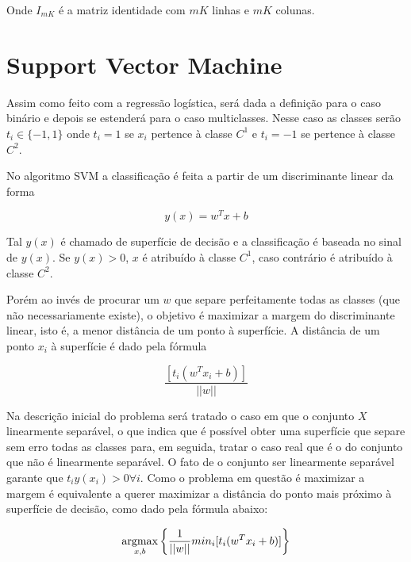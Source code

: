 Onde $I_{mK}$ é a matriz identidade com $mK$ linhas e $mK$ colunas.

\section{Support Vector Machine}

Assim como feito com a regressão logística, será dada a definição
para o caso binário e depois se estenderá para o caso multiclasses. Nesse caso
as  classes serão $t_i \in \{-1, 1\}$ onde $t_i = 1$ se $x_i$ pertence à classe $C^1$ e
$t_i = -1$ se pertence à classe $C^2$.

No algoritmo SVM a classificação é feita a partir de um discriminante linear
da forma 

\begin{center}
	\begin{equation}\label{eq:svm-discriminant}
		y(x) = w^Tx + b
	\end{equation}
\end{center}

Tal $y(x)$ é chamado de superfície de decisão e a classificação é baseada no sinal de
$y(x)$. Se $y(x) > 0$, $x$ é atribuído à classe $C^1$, caso contrário é atribuído à classe
$C^2$.

Porém ao invés de procurar um $w$ que separe perfeitamente todas as classes (que
não necessariamente existe), o objetivo é maximizar a margem do discriminante
linear, isto é, a menor distância de um ponto à superfície. A distância de um ponto $x_i$ à
superfície é dado pela fórmula

\begin{center}
	\begin{equation}
		\frac{[t_i(w^Tx_i + b)]}{||w||}
	\end{equation}
\end{center}
 
Na descrição inicial do problema será tratado o caso em que o conjunto $X$ linearmente separável, 
o que indica que é possível obter uma superfície que separe sem erro todas as classes para, em
seguida, tratar o caso real que é o do conjunto que não é linearmente separável.
O fato de o conjunto ser linearmente separável garante que $t_iy(x_i) > 0 \forall i$.
Como o problema em questão é maximizar a margem é equivalente a querer maximizar
a distância do ponto mais próximo à superfície de decisão, como dado pela fórmula abaixo:

\begin{center}
	\begin{equation}
		\operatorname*{argmax}_{x, b} \left\{ \frac{1}{||w||} min_i [t_i(w^Tx_i + b)] \right\}
	\end{equation}
\end{center}


